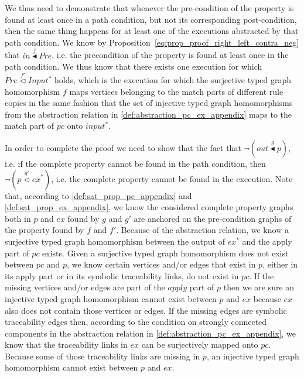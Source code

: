 \begin{pf}
We thus need to demonstrate that whenever the pre-condition of the property is found at least once in a path condition, but not its corresponding post-condition, then the same thing happens for at least one of the executions abstracted by that path condition. We know by Proposition~\ref{eq:prop_proof_right_left_contra_neg} that $in\stackrel{f}{\blacktriangleleft} Pre$, i.e. the precondition of the property is found at least once in the path condition. We thus know that there exists one execution for which $Pre \stackrel{f'}{\vartriangleleft} Input^{*}$ holds, which is the execution for which the surjective typed graph homomorphism $f$ maps vertices belonging to the match parts of different rule copies in the same fashion that the set of injective typed graph homomorphisms from the abstraction relation in \cref{def:abstraction_pc_ex_appendix} maps to the match part of $pc$ onto $input^{*}$.

In order to complete the proof we need to show that the fact that $\neg(out \stackrel{g}\blacktriangleleft p)$, i.e. if the complete property cannot be found in the path condition, then $\neg(p \stackrel{g'}{\vartriangleleft} ex^*)$, i.e. the complete property cannot be found in the execution. Note that, according to \cref{def:sat_prop_pc_appendix} and \cref{def:sat_prop_ex_appendix}, we know the considered complete property graphs both in $p$ and $ex$ found by $g$ and $g'$ are anchored on the pre-condition graphs of the property found by $f$ and $f'$. Because of the abstraction relation, we know a surjective typed graph homomorphism between the output of $ex^{*}$ and the apply part of $pc$ exists. Given a surjective typed graph homomorphism does not exist between $pc$ and $p$, we know certain vertices and/or edges that exist in $p$, either in its apply part or in its symbolic traceability links, do not exist in $pc$. If the missing vertices and/or edges are part of the $apply$ part of $p$ then we are sure an injective typed graph homomorphism cannot exist between $p$ and $ex$ because $ex$ also does not contain those vertices or edges. If the missing edges are symbolic traceability edges then, according to the condition on strongly connected components in the abstraction relation in \cref{def:abstraction_pc_ex_appendix}, we know that the traceability links in $ex$ can be surjectively mapped onto $pc$. Because some of those traceability links are missing in $p$, an injective typed graph homomorphism cannot exist between $p$ and $ex$. 



\end{pf}
